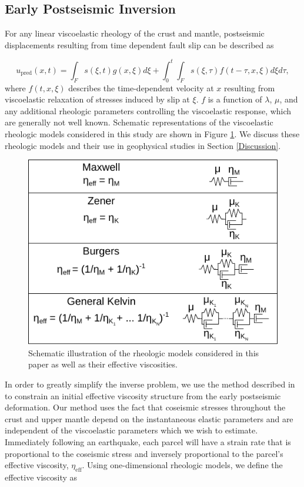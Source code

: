 \documentclass[draft,linenumbers]{AGUJournal}
\begin{document}
\subsection{Early Postseismic Inversion}\label{sec:InitialInversion}
For any linear viscoelastic rheology of the crust and mantle, postseismic displacements resulting from time dependent fault slip can be described as  

\begin{equation}\label{GeneralForward}
  u_\mathrm{pred}(x,t) = \int_F s(\xi,t)g(x,\xi)d\xi + 
           \int_0^t\int_F s(\xi,\tau) f(t-\tau,x,\xi) d\xi d\tau,
\end{equation}
where $f(t,x,\xi)$ describes the time-dependent velocity at $x$ resulting from viscoelastic relaxation of stresses induced by slip at $\xi$. $f$ is a function of $\lambda$, $\mu$, and any additional rheologic parameters controlling the viscoelastic response, which are generally not well known. Schematic representations of the viscoelastic rheologic models considered in this study are shown in Figure \ref{fig:Rheology}.  We discuss these rheologic models and their use in geophysical studies in Section \ref{Discussion}. 

\begin{figure}
\includegraphics[scale=0.9]{Figures/rheology}
\centering 
\caption{Schematic illustration of the rheologic models considered in this paper as well as their effective viscosities.}
\label{fig:Rheology}
\end{figure}

In order to greatly simplify the inverse problem, we use the method described in \citet{Hines2016} to constrain an initial effective viscosity structure from the early postseismic deformation.  Our method uses the fact that coseismic stresses throughout the crust and upper mantle depend on the instantaneous elastic parameters and are independent of the viscoelastic parameters which we wish to estimate. Immediately following an earthquake, each parcel will have a strain rate that is proportional to the coseismic stress and inversely proportional to the parcel's effective viscosity, $\eta_\mathrm{eff}$.  Using one-dimensional rheologic models, we define the effective viscosity as
\end{document}
